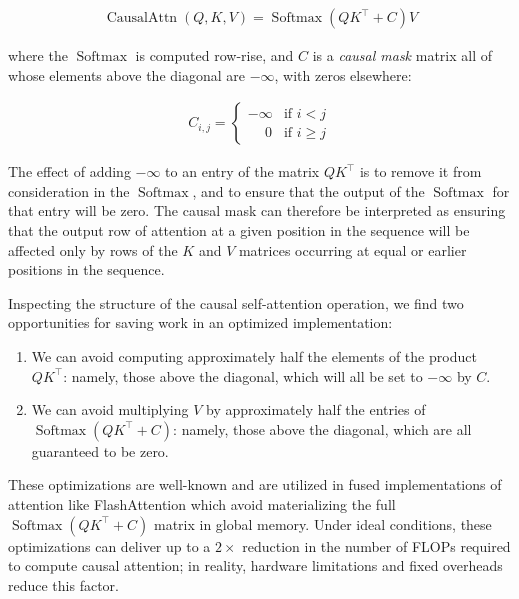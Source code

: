 \begin{align*}
    \operatorname{CausalAttn}(Q, K, V) = \operatorname{Softmax}\left( Q K^\top + C \right) V
\end{align*}

where the $\operatorname{Softmax}$ is computed row-rise, and $C$ is a \emph{causal mask} matrix all of whose elements above the diagonal are $-\infty$, with zeros elsewhere:

\begin{align*}
    C_{i,j} = \begin{cases}
        -\infty & \text{if $i < j$} \\
        \phantom{-}0 & \text{if $i \ge j$}
    \end{cases}
\end{align*}

The effect of adding $-\infty$ to an entry of the matrix $Q K^\top$ is to remove it from consideration in the $\operatorname{Softmax}$, and to ensure that the output of the $\operatorname{Softmax}$ for that entry will be zero. The causal mask can therefore be interpreted as ensuring that the output row of attention at a given position in the sequence will be affected only by rows of the $K$ and $V$ matrices occurring at equal or earlier positions in the sequence.

Inspecting the structure of the causal self-attention operation, we find two opportunities for saving work in an optimized implementation:

\begin{enumerate}[label=(\arabic*), noitemsep, topsep=0pt]
    \item We can avoid computing approximately half the elements of the product $QK^\top$: namely, those above the diagonal, which will all be set to $-\infty$ by $C$.
    \item We can avoid multiplying $V$ by approximately half the entries of $\operatorname{Softmax}(QK^\top + C)$: namely, those above the diagonal, which are all guaranteed to be zero.
\end{enumerate}

These optimizations are well-known and are utilized in fused implementations of attention like FlashAttention \cite{flash_attention,dao2023flashattention} which avoid materializing the full $\operatorname{Softmax}(QK^\top + C)$ matrix in global memory. Under ideal conditions, these optimizations can deliver up to a $2\times$ reduction in the number of FLOPs required to compute causal attention; in reality, hardware limitations and fixed overheads reduce this factor.

